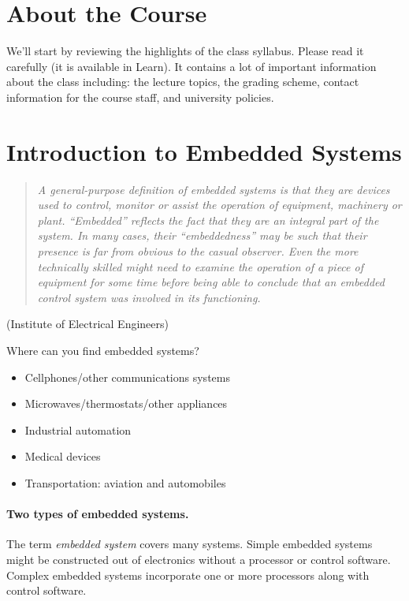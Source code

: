 




\section*{About the Course}
We'll start by reviewing the highlights of the class syllabus. Please read it carefully (it is available in Learn). It contains a lot of important information about the class including: the lecture topics, the grading scheme, contact information for the course staff, and university policies.

\section*{Introduction to Embedded Systems}

\begin{quote}
    \emph{A general-purpose definition of embedded systems is that they
      are devices used to control, monitor or assist the operation of
      equipment, machinery or plant. ``Embedded'' reflects the fact that
      they are an integral part of the system. In many cases, their
      ``embeddedness'' may be such that their presence is far from
      obvious to the casual observer. Even the more technically skilled
      might need to examine the operation of a piece of equipment for
      some time before being able to conclude that an embedded control
      system was involved in its functioning.}
\end{quote}
\hfill(Institute of Electrical Engineers)

Where can you find embedded systems?

\begin{itemize}
	\item Cellphones/other communications systems
	\item Microwaves/thermostats/other appliances
	\item Industrial automation
	\item Medical devices
	\item Transportation: aviation and automobiles
\end{itemize}

\paragraph{Two types of embedded systems.} The term \textit{embedded system}
covers many systems. Simple embedded systems might be constructed out of electronics without a processor or control software. Complex embedded systems incorporate one or more processors along with control software.

